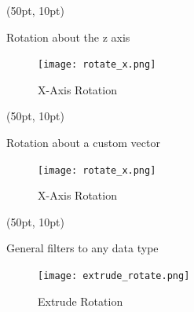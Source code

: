 \documentclass[aspectratio=169,12pt]{beamer}
\begin{document}
\begin{frame}[fragile]
\begin{textblock*}{350pt}(50pt, 10pt)
\begin{block}{Rotation about the z axis}
\end{block}

\begin{figure}
\texttt{[image: rotate\_x.png]}
\caption{X-Axis Rotation}
\end{figure}
\end{textblock*}
\end{frame}

\begin{frame}[fragile]
\begin{textblock*}{350pt}(50pt, 10pt)
\begin{block}{Rotation about a custom vector}
\end{block}

\begin{figure}
\texttt{[image: rotate\_x.png]}
\caption{X-Axis Rotation}
\end{figure}
\end{textblock*}
\end{frame}

\begin{frame}[fragile]
\begin{textblock*}{350pt}(50pt, 10pt)
\begin{block}{General filters to any data type}

\begin{figure}
\texttt{[image: extrude\_rotate.png]}
\caption{Extrude Rotation\label{ExtrudeRotateFigure}}
\end{figure}
\end{block}
\end{textblock*}
\end{frame}
\end{document}
